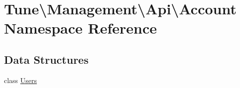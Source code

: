 \hypertarget{namespaceTune_1_1Management_1_1Api_1_1Account}{\section{Tune\textbackslash{}Management\textbackslash{}Api\textbackslash{}Account Namespace Reference}
\label{namespaceTune_1_1Management_1_1Api_1_1Account}
}
\subsection*{Data Structures}
\begin{DoxyCompactItemize}
\item 
class \hyperlink{classTune_1_1Management_1_1Api_1_1Account_1_1Users}{Users}
\end{DoxyCompactItemize}
